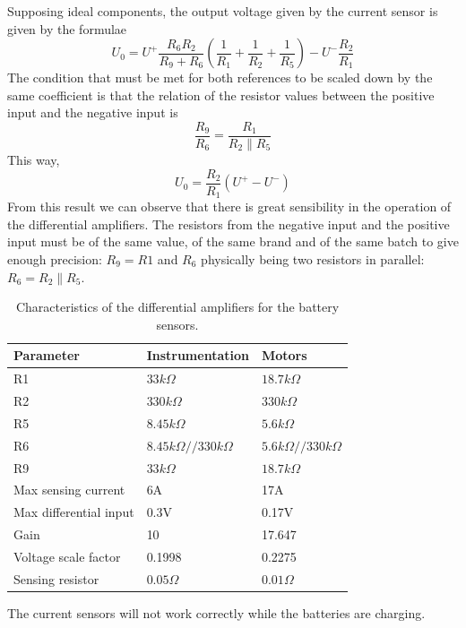 Supposing ideal components, the output voltage given by the current sensor is
given by the formulae
\begin{equation}
U_0 = U^+\frac{R_{6}R_2}{R_9+R_6}(\frac{1}{R_1}+\frac{1}{R_2}+\frac{1}{R_5}) -
      U^-\frac{R_2}{R_1}
\end{equation} The condition that must be met for both references to be scaled down by the same
coefficient is that the relation of the resistor values
between the positive input and the negative input is
\begin{equation}
\frac{R_9}{R_6} = \frac{R_1}{R_2\parallel{}R_5}
\end{equation}
This way,
\[U_0 = \frac{R_2}{R_1}(U^+-U^-)\]
From this result we can observe that
there is great sensibility in the operation of the differential amplifiers. The
resistors from the negative input and the positive input must be of the same
value, of the same brand and of the same batch to give enough precision:
$R_9 = R1$ and $R_6$ physically being two
resistors in parallel: $ R_6 = R_2\parallel{}R_5 $.

\begin{table}
  \centering
  \begin{tabular}{|l||l|l|} \hline
    \textbf{Parameter} & \textbf{Instrumentation} & \textbf{Motors} \\ \hline \hline
	R1 & $33k\Omega$ & $18.7k\Omega$ \\ \hline
	R2 & $330k\Omega$ & $330k\Omega$ \\ \hline
	R5 & $8.45k\Omega$ & $5.6k\Omega$ \\ \hline
	R6 & $8.45k\Omega//330k\Omega$ & $5.6k\Omega//330k\Omega$ \\ \hline
	R9 & $33k\Omega$ & $18.7k\Omega$ \\ \hline
	Max sensing current & 6A & 17A \\ \hline
	Max differential input & 0.3V & 0.17V \\ \hline
	Gain & 10 & 17.647 \\ \hline
	Voltage scale factor & 0.1998 & 0.2275 \\ \hline
	Sensing resistor & $0.05\Omega$ & $0.01\Omega$ \\ \hline
  \end{tabular}
  \caption{Characteristics of the differential amplifiers for the battery
  sensors.}
  \label{tab:ModulesArduinoDifferential}
\end{table}

The current sensors will not work correctly while the batteries are charging.



